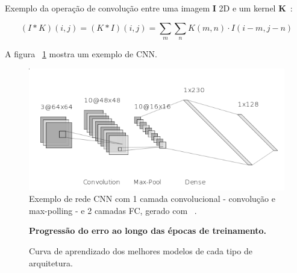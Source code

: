 \documentclass[a0,portrait]{a0poster}
\begin{document}
\begin{multicols}{2}
  Exemplo da operação de convolução entre uma imagem $\mathbf{I}$ 2D e um kernel $\mathbf{K}$~\cite{ia006}:

\begin{equation}
  (I*K)(i, j) = (K*I)(i,j) = \sum_m\sum_n K(m, n) \cdot I(i-m, j-n)
\end{equation}

A figura ~\ref{fig:cnn} mostra um exemplo de CNN.

  \begin{figure}[H]
        {\centering
        \includegraphics[width=\linewidth]{cnn_ex.png}
        \caption{Exemplo de rede CNN com 1 camada convolucional - convolução e max-polling - e 2 camadas FC, gerado com ~\cite{nnsvg}.}
        \label{fig:cnn}\par}
  \end{figure}

  \begin{figure}[H]
        {\centering
        \break\hfill\break
        \break\hfill\break
        \color{Indigo}
        \textbf{\Large Progressão do erro ao longo das épocas de treinamento.}\par\medskip
        \hfill
        \caption{Curva de aprendizado dos melhores modelos de cada tipo de arquitetura.}
        \label{fig:lc}\par}
  \end{figure}




\end{multicols}
\end{document}
